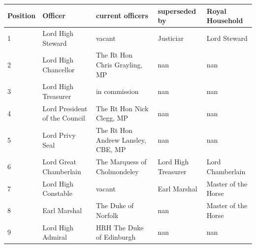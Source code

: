 \documentclass{article}
\begin{document}
\begin{tabular}{lllll}
\toprule
Position & Officer & current officers & superseded by & Royal Household \\
\midrule
1 & Lord High Steward & vacant & Justiciar & Lord Steward \\
2 & Lord High Chancellor & The Rt Hon Chris Grayling, MP & nan & nan \\
3 & Lord High Treasurer & in commission & nan & nan \\
4 & Lord President of the Council & The Rt Hon Nick Clegg, MP & nan & nan \\
5 & Lord Privy Seal & The Rt Hon Andrew Lansley, CBE, MP & nan & nan \\
6 & Lord Great Chamberlain & The Marquess of Cholmondeley & Lord High Treasurer & Lord Chamberlain \\
7 & Lord High Constable & vacant & Earl Marshal & Master of the Horse \\
8 & Earl Marshal & The Duke of Norfolk & nan & Master of the Horse \\
9 & Lord High Admiral & HRH The Duke of Edinburgh & nan & nan \\
\bottomrule
\end{tabular}
\end{document}
